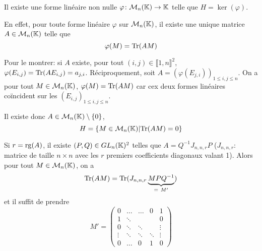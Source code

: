 \begin{remark}
    Il existe une forme linéaire non nulle $\varphi\colon\mathcal{M}_{n}(\mathbb{K})\to \mathbb{K}$ telle que $H=\ker(\varphi)$. 

    En effet, pour toute forme linéaire $\varphi$ sur $\mathcal{M}_{n}(\mathbb{K})$, il existe une unique matrice $A\in\mathcal{M}_{n}(\mathbb{K})$ telle que 
    \begin{equation}
        \varphi(M)=\operatorname{Tr}(AM)
    \end{equation}

    Pour le montrer: si $A$ existe, pour tout $(i,j)\in\llbracket1,n\rrbracket^{2}$, $\varphi(E_{i,j})=\operatorname{Tr}(AE_{i,j})=a_{j,i}$. Réciproquement, soit $A=\left(\varphi(E_{j,i})\right)_{1\leqslant i,j\leqslant n}$. On a pour tout $M\in\mathcal{M}_{n}(\mathbb{K})$, $\varphi(M)=\operatorname{Tr}(AM)$ car cex deux formes linéaires coïncident sur les $(E_{i,j})_{1\leqslant i,j\leqslant n}$.

    Il existe donc $A\in \mathcal{M}_{n}(\mathbb{K})\setminus\lbrace0\rbrace$,
    \begin{equation}
        H=\left\lbrace M\in\mathcal{M}_{n}(\mathbb{K})\middle|\operatorname{Tr}(AM)=0\right\rbrace
    \end{equation}

    Si $r=\operatorname{rg}(A)$, il existe $(P,Q)\in GL_{n}(\mathbb{K})^{2}$ telles que $A=Q^{-1}J_{n,n,r}P$ ($J_{n,n,r}$: matrice de taille $n\times n$ avec les $r$ premiers coefficients diagonaux valant 1). Alors pour tout $M\in \mathcal{M}_{n}(\mathbb{K})$, on a 
    \begin{equation}
        \operatorname{Tr}(AM)=\operatorname{Tr}(J_{n,n,r}\underbrace{MPQ^{-1}}_{=~M'})
    \end{equation}
    et il suffit de prendre 
    \begin{equation}
        M'=
        \begin{pmatrix}
            0 & \dots & \dots & 0 & 1\\
            1 & \ddots & & & 0\\
            0 & \ddots & \ddots& & \vdots\\
            \vdots & \ddots & \ddots&\ddots & \vdots\\
            0 & \dots& 0 & 1 & 0
        \end{pmatrix}
    \end{equation}
\end{remark}

